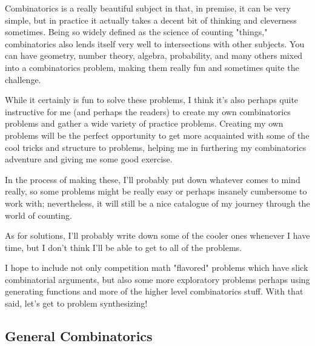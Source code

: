 Combinatorics is a really beautiful subject  in
that, in premise, it can be very simple, but in practice it actually takes a
decent bit of thinking and cleverness sometimes. Being so widely defined as the
science of counting "things," combinatorics also lends itself very well to
intersections with other subjects. You can have geometry, number theory,
algebra, probability, and many others mixed into a combinatorics problem,
making them really fun and sometimes quite the challenge.

While it certainly is fun to solve these problems, I think it's also perhaps
quite instructive for me (and perhaps the readers) to create my own
combinatorics problems and gather a wide variety of practice problems. Creating
my own problems will be the perfect opportunity to get more acquainted with
some of the cool tricks and structure to problems, helping me in furthering my
combinatorics adventure and giving me some good exercise.

In the process of making these, I'll probably put down whatever comes to mind
really, so some problems might be really easy or perhaps insanely cumbersome to
work with; nevertheless, it will still be a nice catalogue of my journey
through the world of counting.

As for solutions, I'll probably write down some of the cooler ones whenever I
have time, but I don't think I'll be able to get to all of the problems.

I hope to include not only competition math "flavored" problems which have slick
combinatorial arguments, but also some more exploratory problems perhaps using
generating functions and more of the higher level combinatorics stuff. With
that said, let's get to problem synthesizing!

\subsection{General Combinatorics}

